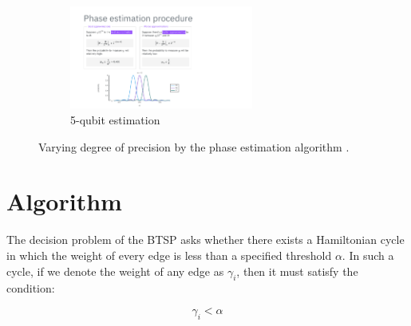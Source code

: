 \documentclass[msc,oneside]{ubcthesis}
\begin{document}
\begin{figure}[ht]
	\vspace{1ex} %
	
	\begin{subfigure}[b]{\linewidth}
		\centering
		\includegraphics[height=3.4cm, trim={2.4cm 0.15cm 6.4cm 5.95cm}, clip]{phase-lecture/29_Phase-estimation-lecture-slides}
		\caption{5-qubit estimation}
		\label{fig:image4}
	\end{subfigure}
	
	\caption{Varying degree of precision by the phase estimation algorithm \cite{Phase-estimation}.}
	\label{fig:phase-precision}
\end{figure}
	
	\chapter{Algorithm}
	
The decision problem of the BTSP asks whether there exists a Hamiltonian cycle in which the weight of every edge is less than a specified threshold $\alpha$. In such a cycle, if we denote the weight of any edge as $\gamma_i$, then it must satisfy the condition:
	
	\begin{equation}\label{constraint-alpha} 
	 \gamma_i < \alpha
	\end{equation}
	
\end{document}
